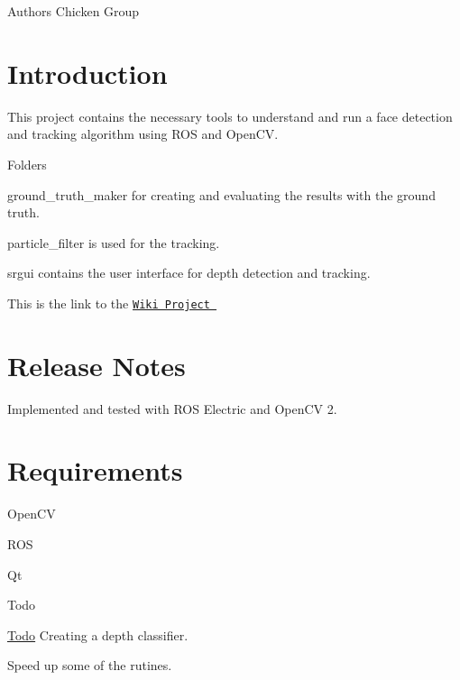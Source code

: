 \begin{DoxyAuthor}{Authors}
Chicken Group
\end{DoxyAuthor}
\hypertarget{index_intro}{}\section{Introduction}\label{index_intro}
This project contains the necessary tools to understand and run a face detection and tracking algorithm using R\-O\-S and Open\-C\-V.


\begin{DoxyItemize}
\item Folders
\end{DoxyItemize}
\begin{DoxyEnumerate}
\item ground\-\_\-truth\-\_\-maker for creating and evaluating the results with the ground truth.
\item particle\-\_\-filter is used for the tracking.
\item srgui contains the user interface for depth detection and tracking.
\end{DoxyEnumerate}

This is the link to the \href{http://code.google.com/p/scoialrobot/}{\tt Wiki Project }



 \hypertarget{index_notes}{}\section{Release Notes}\label{index_notes}
Implemented and tested with R\-O\-S Electric and Open\-C\-V 2. 

 \hypertarget{index_requirements}{}\section{Requirements}\label{index_requirements}

\begin{DoxyItemize}
\item Open\-C\-V
\item R\-O\-S
\item Qt 

 \begin{DoxyRefDesc}{Todo}
\item[\hyperlink{todo__todo000001}{Todo}]Creating a depth classifier. 

Speed up some of the rutines.\end{DoxyRefDesc}

\end{DoxyItemize}